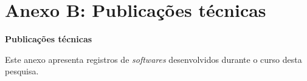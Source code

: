 \chapter{Anexo B: Publicações técnicas}
\label{an:b}
\begin{center}
    \textbf{Publicações técnicas}
\end{center}

Este anexo apresenta registros de \emph{softwares} desenvolvidos durante o curso desta pesquisa.

